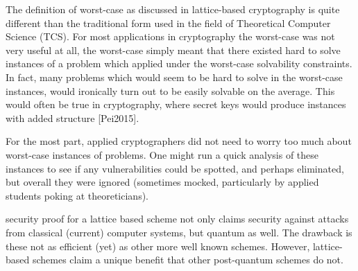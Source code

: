The definition of worst-case as discussed in lattice-based cryptography is quite different than the traditional form used in the field of Theoretical Computer Science (TCS). For most applications in cryptography the worst-case was not very useful at all, the worst-case simply meant that there existed hard to solve instances of a problem which applied under the worst-case solvability constraints. In fact, many problems which would seem to be hard to solve in the worst-case instances, would ironically turn out to be easily solvable on the average. This would often be true in cryptography, where secret keys would produce instances with added structure [Pei2015].  


For the most part, applied cryptographers did not need to worry too much about worst-case instances of problems. One might run a quick analysis of these instances to see if any vulnerabilities could be spotted, and perhaps eliminated, but overall they were ignored (sometimes mocked, particularly by applied students poking at theoreticians). 


security proof for a lattice based scheme not only claims security against attacks from classical (current) computer systems, but quantum as well. The drawback is these not as efficient (yet) as other more well known schemes. However, lattice-based schemes claim a unique benefit that other post-quantum schemes do not. 